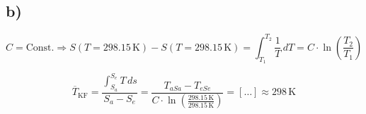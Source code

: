 

\subsection*{b)}
\[
C = \text{Const.} \Rightarrow S(T = 298.15 \, \text{K}) - S(T = 298.15 \, \text{K}) = \int_{T_1}^{T_2} \frac{1}{T} \, dT = C \cdot \ln \left( \frac{T_2}{T_1} \right)
\]

\[
\overline{T}_{\text{KF}} = \frac{\int_{S_a}^{S_e} T \, ds}{S_a - S_e} = \frac{T_{aSa} - T_{eSe}}{C \cdot \ln \left( \frac{298.15 \, \text{K}}{298.15 \, \text{K}} \right)} = \left[ \ldots \right] \approx 298 \, \text{K}
\]